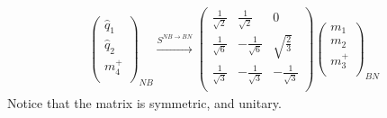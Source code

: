 \begin{align}
\left( \begin{matrix}
\widehat{{q}}_1\\
\widehat{{q}}_2\\
m_4^+\\
\end{matrix} \right)_{NB}
\xrightarrow{S^{NB \rightarrow BN}}
\left( \begin{matrix}
\frac{1}{\sqrt{2}}& \frac{1}{\sqrt{2}}& 0 \\
\frac{1}{\sqrt{6}} & - \frac{1}{\sqrt{6}} & \sqrt{\frac{2}{3}} \\
\frac{1}{\sqrt{3}} & - \frac{1}{\sqrt{3}} & - \frac{1}{\sqrt{3}} \\
\end{matrix} \right)
\left( \begin{matrix}
{m}_1\\
{m}_2\\
m_3^+\\
\end{matrix} \right)_{BN}
\end{align}
Notice that the matrix is symmetric, and unitary.

